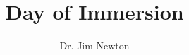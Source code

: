 \documentclass[13pt]{article}
\title{Day of Immersion}
\author{Dr. Jim Newton}
\begin{document}
\maketitle
\begin{spacing}{2.23}









\end{spacing}
\end{document}
